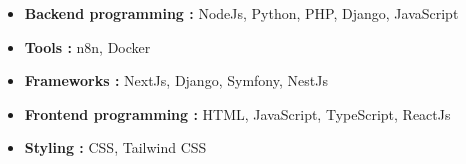 

\begin{itemize}


\item \textbf{Backend programming :} NodeJs, Python, PHP, Django, JavaScript



\item \textbf{Tools :} n8n, Docker



\item \textbf{Frameworks :} NextJs, Django, Symfony, NestJs



\item \textbf{Frontend programming :} HTML, JavaScript, TypeScript, ReactJs



\item \textbf{Styling :} CSS, Tailwind CSS

\end{itemize}